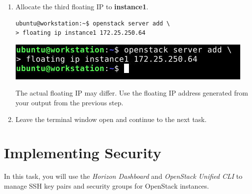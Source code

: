 \documentclass[letterpaper, 12pt]{article}
\begin{document}
\begin{enumerate}
    \item Allocate the third floating IP to \textbf{instance1}.
\begin{lstlisting}
ubuntu@workstation:~$ openstack server add \
> floating ip instance1 172.25.250.64
\end{lstlisting}

    \begin{center}
        \includegraphics[width=\linewidth]{images/part3/step15.png}
    \end{center}

    \begin{notebox}{}
        The actual floating IP may differ. Use the floating IP address generated from your output from the previous
        step.
    \end{notebox}

    \item Leave the terminal window open and continue to the next task.

\end{enumerate}

\section{Implementing Security}
\label{sec:implementing_security}
In this task, you will use the \textit{Horizon Dashboard} and \textit{OpenStack Unified CLI} to manage SSH key pairs and
security groups for OpenStack instances.
\end{document}
